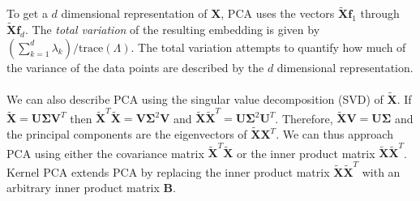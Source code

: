 To get a $d$ dimensional representation of $\mathbf{X}$, PCA uses the
vectors $\tilde{\mathbf{X}}\mathbf{f}_1$ through
$\tilde{\mathbf{X}}\mathbf{f}_d$. The \emph{total variation} of the
resulting embedding is given by
$(\sum_{k=1}^{d}{\lambda_k})/\mathrm{trace}(\Lambda)$. The total
variation attempts to quantify how much of the variance of the data
points are described by
the $d$ dimensional representation. \\ \\
%
%
\noindent
We can also describe PCA using the singular value decomposition (SVD)
of $\tilde{\mathbf{X}}$. If $\tilde{\mathbf{X}} = \mathbf{U}
\bm{\Sigma} \mathbf{V}^{T}$ then
$\tilde{\mathbf{X}}^{T}\tilde{\mathbf{X}} = \mathbf{V} \bm{\Sigma}^{2}
\mathbf{V}$ and $\tilde{\mathbf{X}}\tilde{\mathbf{X}}^{T} =
\mathbf{U}\bm{\Sigma}^{2} \mathbf{U}^{T}$. Therefore,
$\tilde{\mathbf{X}}\mathbf{V} = \mathbf{U}\mathbf{\Sigma}$ and the
principal components are the eigenvectors of
$\tilde{\mathbf{X}}\mathbf{X}^{T}$. We can thus approach PCA using
either the covariance matrix
$\tilde{\mathbf{X}}^{T}\tilde{\mathbf{X}}$ or the inner product matrix
$\tilde{\mathbf{X}}\tilde{\mathbf{X}}^{T}$. Kernel PCA
\citep{scholkopf97:_lectur_notes_comput_scien} extends PCA by
replacing the inner product matrix
$\tilde{\mathbf{X}}\tilde{\mathbf{X}}^{T}$ with an arbitrary inner
product matrix $\mathbf{B}$.

